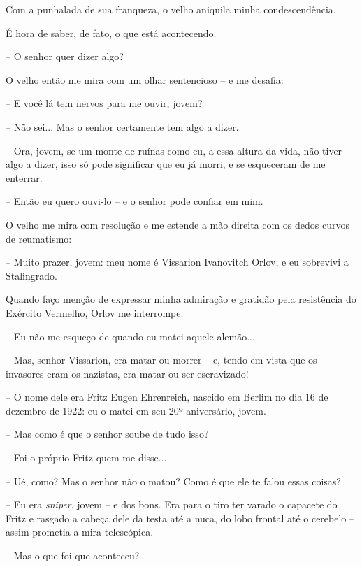 Com a punhalada de sua franqueza, o velho aniquila minha
condescendência.

É hora de saber, de fato, o que está acontecendo.

-- O senhor quer dizer algo?

O velho então me mira com um olhar sentencioso -- e me desafia:

-- E você lá tem nervos para me ouvir, jovem?

-- Não sei... Mas o senhor certamente tem algo a dizer.

-- Ora, jovem, se um monte de ruínas como eu, a essa altura da vida, não
tiver algo a dizer, isso só pode significar que eu já morri, e se
esqueceram de me enterrar.

-- Então eu quero ouvi-lo -- e o senhor pode confiar em mim.

O velho me mira com resolução e me estende a mão direita com os dedos
curvos de reumatismo:

-- Muito prazer, jovem: meu nome é Vissarion Ivanovitch Orlov, e eu
sobrevivi a Stalingrado.

Quando faço menção de expressar minha admiração e gratidão pela
resistência do Exército Vermelho, Orlov me interrompe:

-- Eu não me esqueço de quando eu matei aquele alemão...

-- Mas, senhor Vissarion, era matar ou morrer -- e, tendo em vista que
os invasores eram os nazistas, era matar ou ser escravizado!

-- O nome dele era Fritz Eugen Ehrenreich, nascido em Berlim no dia 16
de dezembro de 1922: eu o matei em seu 20º aniversário, jovem.

-- Mas como é que o senhor soube de tudo isso?

-- Foi o próprio Fritz quem me disse...

-- Ué, como? Mas o senhor não o matou? Como é que ele te falou essas
coisas?

-- Eu era \emph{sniper}, jovem -- e dos bons. Era para o tiro ter varado
o capacete do Fritz e rasgado a cabeça dele da testa até a nuca, do lobo
frontal até o cerebelo -- assim prometia a mira telescópica.

-- Mas o que foi que aconteceu?

